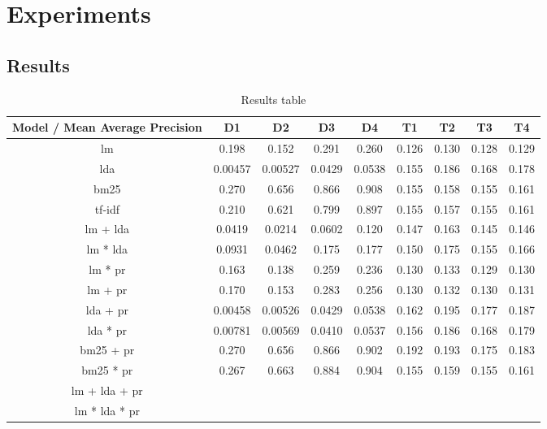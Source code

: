 \section{Experiments}\label{sec:experiment}


\subsection{Results}\label{subsec:results}

\begin{table*}[h]
	\centering
	\caption{Results table}
	\begin{tabular}{c|c|c|c|c|c|c|c|c}
		Model / Mean Average Precision & D1 & D2 & D3 & D4 & T1 & T2 & T3 & T4 \\
		\midrule
		\gls{lm} & 0.198 & 0.152 & 0.291 & 0.260 & 0.126 & 0.130 & 0.128 & 0.129 \\  
		\gls{lda} & 0.00457 & 0.00527 & 0.0429 & 0.0538 & 0.155 & 0.186 & 0.168 & 0.178 \\
		\gls{bm25} & 0.270 & 0.656 & 0.866 & 0.908 & 0.155 & 0.158 & 0.155 & 0.161 \\
		\gls{tf-idf} & 0.210 & 0.621 & 0.799 & 0.897 & 0.155 & 0.157 & 0.155 & 0.161 \\
		\gls{lm} + \gls{lda} & 0.0419 & 0.0214 & 0.0602 & 0.120 & 0.147 & 0.163 & 0.145 & 0.146 \\
		\gls{lm} * \gls{lda} & 0.0931 & 0.0462 & 0.175 & 0.177 & 0.150 & 0.175 & 0.155 & 0.166 \\
		\gls{lm} * \gls{pr} & 0.163 & 0.138 & 0.259 & 0.236 & 0.130 & 0.133 & 0.129 & 0.130 \\
		\gls{lm} + \gls{pr} & 0.170 & 0.153 & 0.283 & 0.256 & 0.130 & 0.132 & 0.130 & 0.131 \\
		\gls{lda} + \gls{pr} & 0.00458 & 0.00526 & 0.0429 & 0.0538 & 0.162 & 0.195 & 0.177 & 0.187 \\
		\gls{lda} * \gls{pr} & 0.00781 & 0.00569 & 0.0410 & 0.0537 & 0.156 & 0.186 & 0.168 & 0.179 \\
		\gls{bm25} + \gls{pr} & 0.270 & 0.656 & 0.866 & 0.902 & 0.192 & 0.193 & 0.175 & 0.183 \\
		\gls{bm25} * \gls{pr} & 0.267 & 0.663 & 0.884 & 0.904 & 0.155 & 0.159 & 0.155 & 0.161 \\
		\gls{lm} + \gls{lda} + \gls{pr} & & & & & & & & \\
		\gls{lm} * \gls{lda} * \gls{pr} & & & & & & & & \\
	\end{tabular}
	
	\label{tab:results}
\end{table*}